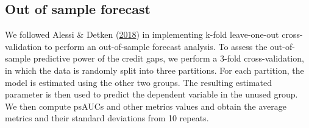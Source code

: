 \documentclass[
  12pt,
]{article}
\begin{document}
\hypertarget{cross-validation}{%
\subsection{Out of sample forecast}\label{cross-validation}}

We followed Alessi \& Detken (\protect\hyperlink{ref-alessi_identifying_2018}{2018}) in implementing k-fold leave-one-out cross-validation to perform an out-of-sample forecast analysis. To assess the out-of-sample predictive power of the credit gaps, we perform a 3-fold cross-validation, in which the data is randomly split into three partitions. For each partition, the model is estimated using the other two groups. The resulting estimated parameter is then used to predict the dependent variable in the unused group. We then compute psAUCs and other metrics values and obtain the average metrics and their standard deviations from 10 repeats.
\end{document}
